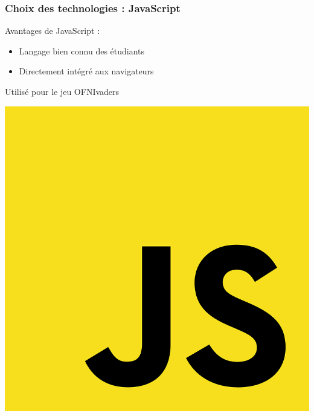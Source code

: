 \begin{frame}
    \frametitle{Choix des technologies : JavaScript}

    \begin{minipage}{0.48\textwidth}
        \centering
	Avantages de JavaScript : 
	\begin{itemize}
	    \item Langage bien connu des étudiants
	    \item Directement intégré aux navigateurs
	\end{itemize}
	\bigskip
	Utilisé pour le jeu OFNIvaders
    \end{minipage}
    \hfill
    \begin{minipage}{0.48\textwidth}
        \centering
        \includegraphics[width=\linewidth]{pictures/javascript.png}
    \end{minipage}
\end{frame}
